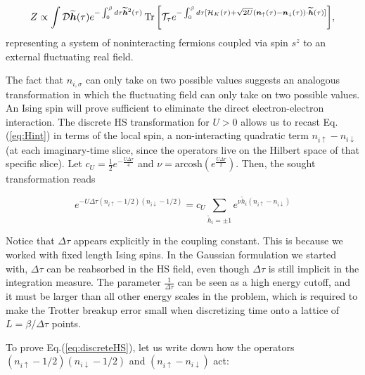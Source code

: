 \begin{equation}
Z \propto \int \mathcal{D} \widetilde{\bm h} ( \tau) e^{-\int_0^\beta d\tau \widetilde{\bm h}^2 ( \tau ) } \operatorname{Tr} \bigg[ \mathcal{T}_\tau e^{ -\int_0^\beta d\tau [ \mathcal{H}_K ( \tau ) + \sqrt{2U} ( \bm n_{\uparrow} (\tau) - \bm n_{\downarrow} (\tau ) ) \cdot \widetilde{\bm h}(\tau) ] } \bigg] ,
\end{equation}
representing a system of noninteracting fermions coupled via spin $s^z$ to an external fluctuating real field.

The fact that $n_{i,\sigma}$ can only take on two possible values suggests an analogous transformation in which the fluctuating field can only take on two possible values.
An Ising spin will prove sufficient to eliminate the direct electron-electron interaction.
The discrete HS transformation for $U > 0$ allows us to recast Eq.(\ref{eq:Hint}) in terms of the local spin, a non-interacting quadratic term $n_{i\uparrow} - n_{i\downarrow} $ (at each imaginary-time slice, since the operators live on the Hilbert space of that specific slice).
Let $c_U = \frac{1}{2} e^{-\frac{U\Delta \tau}{4}}$ and $\nu = \text{arcosh} ( e^{\frac{U\Delta\tau}{2}})$.
Then, the sought transformation reads

\begin{equation}\label{eq:discreteHS}
e^{-U \Delta\tau (n_{i\uparrow} - 1/2 ) (n_{i\downarrow} - 1/2 )} = c_U \sum_{\widetilde{h}_i = \pm 1} e^{\nu \widetilde{h}_i (n_{i\uparrow} - n_{i\downarrow} )}
\end{equation}

Notice that $\Delta \tau$ appears explicitly in the coupling constant.
This is because we worked with fixed length Ising spins.
In the Gaussian formulation we started with, $\Delta \tau$ can be reabsorbed in the HS field, even though $\Delta \tau$ is still implicit in the integration measure.
The parameter $\frac{1}{\Delta \tau}$ can be seen as a high energy cutoff, and it must be larger than all other energy scales in the problem, which is required to make the Trotter breakup error small when discretizing time onto 	a lattice of $L = \beta / \Delta \tau$ points.

To prove Eq.(\ref{eq:discreteHS}), let us write down how the operators  $(n_{i\uparrow} - 1/2 ) (n_{i\downarrow} - 1/2 )$ and $(n_{i\uparrow} - n_{i\downarrow} )$ act:

